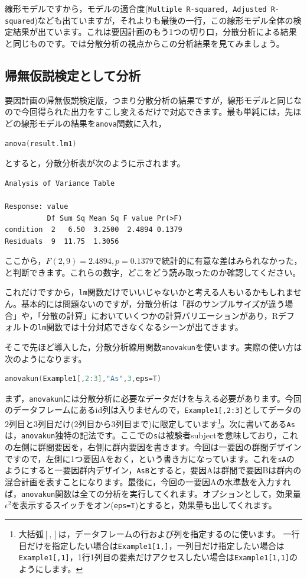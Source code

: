 \documentclass{ltjsarticle}
\begin{document}
線形モデルですから，モデルの適合度(\texttt{Multiple R-squared, Adjusted R-squared})なども出ていますが，それよりも最後の一行，この線形モデル全体の検定結果が出ています。これは要因計画のもう1つの切り口，分散分析による結果と同じものです。では分散分析の視点からこの分析結果を見てみましょう。

\subsection{帰無仮説検定として分析}
要因計画の帰無仮説検定版，つまり分散分析の結果ですが，線形モデルと同じなので今回得られた出力をすこし変えるだけで対応できます。最も単純には，先ほどの線形モデルの結果を\texttt{anova}関数に入れ，
\begin{lstlisting}[language=c++]
anova(result.lm1)
\end{lstlisting}
とすると，分散分析表が次のように示されます。
\begin{tcolorbox}
\begin{verbatim}
Analysis of Variance Table

Response: value
          Df Sum Sq Mean Sq F value Pr(>F)
condition  2   6.50  3.2500  2.4894 0.1379
Residuals  9  11.75  1.3056   
\end{verbatim}
\end{tcolorbox}
ここから，$F(2,9)=2.4894,p=0.1379$で統計的に有意な差はみられなかった，と判断できます。これらの数字，どこをどう読み取ったのか確認してください。

これだけですから，\texttt{lm}関数だけでいいじゃないかと考える人もいるかもしれません。基本的には問題ないのですが，分散分析は「群のサンプルサイズが違う場合」や，「分散の計算」においていくつかの計算バリエーションがあり，Rデフォルトの\texttt{lm}関数では十分対応できなくなるシーンが出てきます。

そこで先ほど導入した，分散分析線用関数\texttt{anovakun}を使います。実際の使い方は次のようになります。
\begin{lstlisting}[language=c++]
anovakun(Example1[,2:3],"As",3,eps=T)
\end{lstlisting}

まず，\texttt{anovakun}には分散分析に必要なデータだけを与える必要があります。今回のデータフレームにあるid列は入りませんので，\texttt{Example1[,2:3]}としてデータの2列目と3列目だけ(2列目から3列目まで)に限定しています\footnote{大括弧$\left[, \right]$は，データフレームの行および列を指定するのに使います。 一行目だけを指定したい場合は\texttt{Example1[1,]}，一列目だけ指定したい場合は\texttt{Example1[,1]}，1行1列目の要素だけアクセスしたい場合は\texttt{Example1[1,1]}のようにします。}。次に書いてある\texttt{As}は，\texttt{anovakun}独特の記法です。ここでの\texttt{s}は被験者subjectを意味しており，これの左側に群間要因を，右側に群内要因を書きます。今回は一要因の群間デザインですので，左側に1つ要因Aをおく，という書き方になっています。これを\texttt{sA}のようにすると一要因群内デザイン，\texttt{AsB}とすると，要因Aは群間で要因Bは群内の混合計画を表すことになります。最後に，今回の一要因Aの水準数を入力すれば，\texttt{anovakun}関数は全ての分析を実行してくれます。オプションとして，効果量$\epsilon^2$を表示するスイッチをオン(\texttt{eps=T})とすると，効果量も出してくれます。
\end{document}
